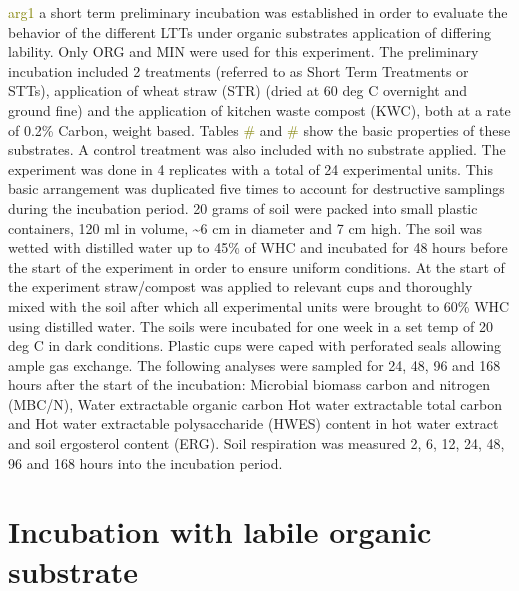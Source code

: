 \documentclass[12pt]{report}
\newcommand{\myGreen}[1]{\textcolor{olive}{#1}} %
\begin{document}
\myGreen{arg1}
a short term preliminary incubation was established in order to evaluate the behavior of the different LTTs under organic substrates application of differing lability.  Only ORG and MIN were used for this experiment.  The preliminary incubation included 2 treatments (referred to as Short Term Treatments or STTs), application of wheat straw (STR) (dried at 60 deg C overnight and ground fine) and the application of kitchen waste compost (KWC), both at a rate of 0.2\% Carbon, weight based. Tables \myGreen{\#} and \myGreen{\#} show the basic properties of these substrates. A control treatment was also included with no substrate applied. The experiment was done in 4 replicates with a total of 24 experimental units. This basic arrangement was duplicated five times to account for destructive samplings during the incubation period. 20 grams of soil were packed into small plastic containers, 120 ml in volume, \~{}6 cm in diameter and 7 cm high. The soil was wetted with distilled water up to 45\% of WHC and incubated for 48 hours before the start of the experiment in order to ensure uniform conditions. At the start of the experiment straw/compost was applied to relevant cups and thoroughly mixed with the soil after which all experimental units were brought to 60\% WHC using distilled water. The soils were incubated for one week in a set temp of 20 deg C in dark conditions. Plastic cups were caped with perforated seals allowing ample gas exchange. The following analyses were sampled for 24, 48, 96 and 168 hours after the start of the incubation: Microbial biomass carbon and nitrogen (MBC/N), Water extractable organic carbon  Hot water extractable total carbon  and Hot water extractable polysaccharide (HWES) content in hot water extract and soil ergosterol content (ERG). Soil respiration was measured 2, 6, 12, 24, 48, 96 and 168 hours into the incubation period. 

	

\section{Incubation with labile organic substrate}
\end{document}
